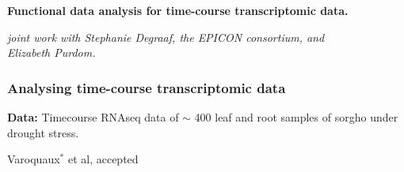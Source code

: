 \documentclass[11pt,xcolor=dvipsnames]{beamer}
\begin{document}
\begin{frame}
\Large{ \bf
Functional data analysis for time-course transcriptomic data.}

\begin{flushright}
\vspace{1em}
\small
\textit{joint work with Stephanie Degraaf, the EPICON consortium, and \\
Elizabeth Purdom.}
\end{flushright}
\end{frame}

\begin{frame}
\frametitle{Analysing time-course transcriptomic data}
\footnotesize
\begin{overlayarea}{12cm}{5cm}
\vspace{1em}

{\bf Data:} Timecourse RNAseq data of $\sim$ 400 leaf and root samples of
sorgho under drought stress.

\vspace{1em}

\vspace{1em}
\end{overlayarea}

\begin{flushright}
{\tiny {\color{red} Varoquaux$^*$} et al, accepted}
\end{flushright}
\begin{overlayarea}{12cm}{3cm}
{\centering
\begin{center}
\end{center}}
\end{overlayarea}
\end{frame}
\end{document}
